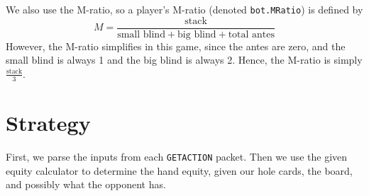 \documentclass{article}
\begin{document}

We also use the M-ratio, so a player's M-ratio (denoted \texttt{bot.MRatio}) is defined by
\[ M = \frac{\text{stack}}{\text{small blind} + \text{big blind} + \text{total antes}} \]
However, the M-ratio simplifies in this game, since the antes are zero, and the small blind is always 1 and the big blind is always 2. Hence, the M-ratio is simply $\frac{\text{stack}}{3}$.

\section*{Strategy}
First, we parse the inputs from each \texttt{GETACTION} packet. Then we use the given equity calculator to determine the hand equity, given our hole cards, the board, and possibly what the opponent has.
\end{document}
